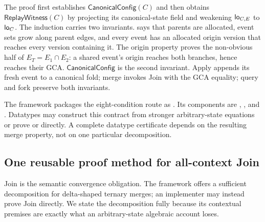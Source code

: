 The proof first establishes $\mathsf{CanonicalConfig}(C)$ and then obtains
$\mathsf{ReplayWitness}(C)$ by projecting its canonical-state field and weakening
$\mathsf{lo}_{C,E}$ to $\mathsf{lo}_C$. The induction carries two invariants.  says that parents are
allocated, event sets grow along parent edges, and every event has an allocated
origin version that reaches every version containing it. The origin property
proves the non-obvious half of
$E_T=E_1\cap E_2$: a shared event's origin reaches both branches, hence reaches
their GCA. $\mathsf{CanonicalConfig}$ is the second invariant. Apply appends
its fresh event to a canonical fold; merge invokes Join with the GCA equality;
query and fork preserve both invariants.

The framework packages the eight-condition route as
. Its components are ,
, and . Datatypes may construct
this contract from stronger arbitrary-state equations or prove  or
 directly. A complete
datatype certificate depends on the resulting merge property, not on one
particular decomposition.

\subsection{One reusable proof method for all-context Join}

Join is the semantic convergence obligation. The framework offers a sufficient
decomposition for delta-shaped ternary merges; an implementer may instead
prove Join directly. We state the decomposition fully because its contextual
premises are exactly what an arbitrary-state algebraic account loses.

